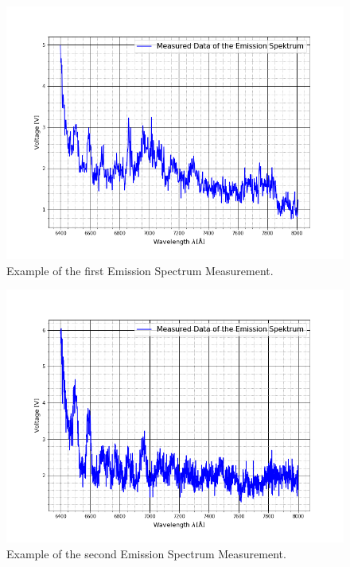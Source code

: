 \begin{figure}[ht]
	\includegraphics[scale=0.5]{Bild/E1}
	\centering
	\caption{Example of the first Emission Spectrum Measurement.}
\end{figure}
\begin{figure}[ht]
	\includegraphics[scale=0.5]{Bild/E2}
	\centering
	\caption{Example of the second Emission Spectrum Measurement.}
\end{figure}
